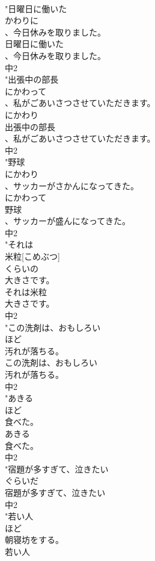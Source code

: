 \documentclass[8pt]{extreport}
\begin{document}
\begin{CJK}{UTF8}{min}
\\	"日曜日に働いた
\\	かわりに
\\	、今日休みを取りました。
\\	日曜日に働いた
\\	、今日休みを取りました。
\\	中2
\\	"出張中の部長
\\	にかわって
\\	、私がごあいさつさせていただきます。　
\\	にかわり
\\	出張中の部長
\\	、私がごあいさつさせていただきます。
\\	中2
\\	"野球
\\	にかわり
\\	、サッカーがさかんになってきた。　
\\	にかわって
\\	野球
\\	、サッカーが盛んになってきた。
\\	中2
\\	"それは
\\	米粒[こめぶつ]
\\	くらいの
\\	大きさです。
\\	それは米粒
\\	大きさです。
\\	中2
\\	"この洗剤は、おもしろい
\\	ほど
\\	汚れが落ちる。
\\	この洗剤は、おもしろい
\\	汚れが落ちる。
\\	中2
\\	"あきる
\\	ほど
\\	食べた。
\\	あきる
\\	食べた。
\\	中2
\\	"宿題が多すぎて、泣きたい
\\	ぐらいだ
\\	宿題が多すぎて、泣きたい
\\	中2
\\	"若い人
\\	ほど
\\	朝寝坊をする。
\\	若い人

\end{CJK}
\end{document}
